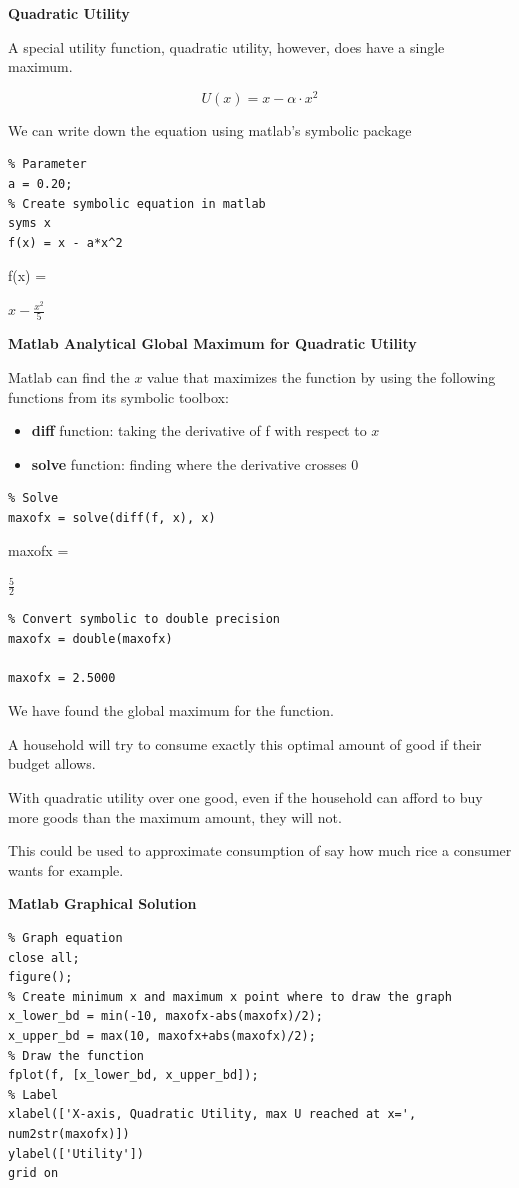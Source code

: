\documentclass[
]{book}
\begin{document}
\textbf{Quadratic Utility}

A special utility function, quadratic utility, however, does have a
single maximum.

\[U(x)=x-\alpha \cdot x^2\]

We can write down the equation using matlab's symbolic package

\begin{verbatim}
% Parameter
a = 0.20;
% Create symbolic equation in matlab
syms x
f(x) = x - a*x^2
\end{verbatim}

f(x) =

\(\displaystyle x-\frac{x^2 }{5}\)

\textbf{Matlab Analytical Global Maximum for Quadratic Utility}

Matlab can find the \(x\) value that maximizes the function by using the
following functions from its symbolic toolbox:

\begin{itemize}
\item
  \textbf{diff} function: taking the derivative of f with respect to \(x\)
\item
  \textbf{solve} function: finding where the derivative crosses \(0\)
\end{itemize}

\begin{verbatim}
% Solve
maxofx = solve(diff(f, x), x)
\end{verbatim}

maxofx =

\(\displaystyle \frac{5}{2}\)

\begin{verbatim}
% Convert symbolic to double precision
maxofx = double(maxofx)

maxofx = 2.5000
\end{verbatim}

We have found the global maximum for the function.

A household will try to consume exactly this optimal amount of good if
their budget allows.

With quadratic utility over one good, even if the household can afford
to buy more goods than the maximum amount, they will not.

This could be used to approximate consumption of say how much rice a
consumer wants for example.

\textbf{Matlab Graphical Solution}

\begin{verbatim}
% Graph equation
close all;
figure();
% Create minimum x and maximum x point where to draw the graph
x_lower_bd = min(-10, maxofx-abs(maxofx)/2);
x_upper_bd = max(10, maxofx+abs(maxofx)/2);
% Draw the function
fplot(f, [x_lower_bd, x_upper_bd]);
% Label
xlabel(['X-axis, Quadratic Utility, max U reached at x=', num2str(maxofx)])
ylabel(['Utility'])
grid on
\end{verbatim}
\end{document}
